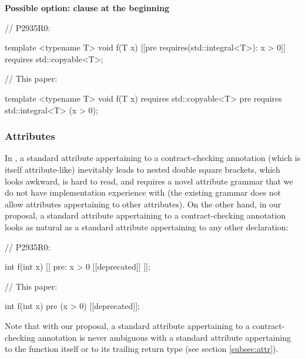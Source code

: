 \textbf{Possible option:  clause at the beginning}

\begin{minipage}[t]{8cm}
\begin{codeblock}
// P2935R0:

  template <typename T>
  void f(T x)
    [[pre requires(std::integral<T>): x > 0]]
    requires std::copyable<T>;
\end{codeblock}
\end{minipage}
\begin{minipage}[t]{8cm}
\begin{codeblock}
// This paper:

  template <typename T>
  void f(T x)
    requires std::copyable<T>
    pre requires std::integral<T> (x > 0);
\end{codeblock}
\end{minipage}

\subsubsection{Attributes}

In \cite{P2935R0}, a standard attribute appertaining to a contract-checking annotation (which is itself attribute-like) inevitably leads to nested double square brackets, which looks awkward, is hard to read, and requires a novel attribute grammar that we do not have implementation experience with (the existing grammar does not allow attributes appertaining to other attributes). On the other hand, in our proposal, a standard attribute appertaining to a contract-checking annotation looks as natural as a standard attribute appertaining to any other declaration:

\begin{minipage}[t]{8cm}
\begin{codeblock}
// P2935R0:

int f(int x) 
  [[ pre: x > 0 [[deprecated]] ]];
\end{codeblock}
\end{minipage}
\begin{minipage}[t]{8cm}
\begin{codeblock}
// This paper:

int f(int x) 
  pre (x > 0) [[deprecated]];
\end{codeblock}
\end{minipage}
\vspace{5mm}

Note that with our proposal, a standard attribute appertaining to a contract-checking annotation is never ambiguous with a standard attribute appertaining to the function itself or to its trailing return type (see section \ref{subsec:attr}).

